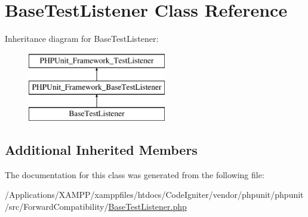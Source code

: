 \hypertarget{class_p_h_p_unit_1_1_framework_1_1_base_test_listener}{}\section{Base\+Test\+Listener Class Reference}
\label{class_p_h_p_unit_1_1_framework_1_1_base_test_listener}
Inheritance diagram for Base\+Test\+Listener\+:\begin{figure}[H]
\begin{center}
\leavevmode
\includegraphics[height=3.000000cm]{class_p_h_p_unit_1_1_framework_1_1_base_test_listener}
\end{center}
\end{figure}
\subsection*{Additional Inherited Members}


The documentation for this class was generated from the following file\+:\begin{DoxyCompactItemize}
\item 
/\+Applications/\+X\+A\+M\+P\+P/xamppfiles/htdocs/\+Code\+Igniter/vendor/phpunit/phpunit/src/\+Forward\+Compatibility/\mbox{\hyperlink{_forward_compatibility_2_base_test_listener_8php}{Base\+Test\+Listener.\+php}}\end{DoxyCompactItemize}

